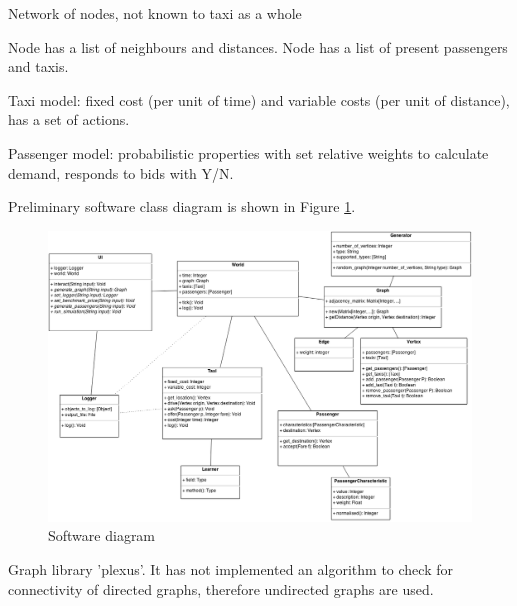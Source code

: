 Network of nodes, not known to taxi as a whole

Node has a list of neighbours and distances.
Node has a list of present passengers and taxis.

Taxi model: fixed cost (per unit of time) and variable costs (per unit of
distance), has a set of actions.

Passenger model: probabilistic properties with set relative weights to
calculate demand, responds to bids with Y/N.

Preliminary software class diagram is shown in Figure
\ref{figure:design:software}.

\begin{figure}
  \begin{center}
    \includegraphics[width=\textwidth]{../figures/software_diagram}
    \caption{
      Software diagram
      \label{figure:design:software}
    }
  \end{center}
\end{figure}

Graph library 'plexus'. It has not implemented an algorithm to check for
connectivity of directed graphs, therefore undirected graphs are
used.
